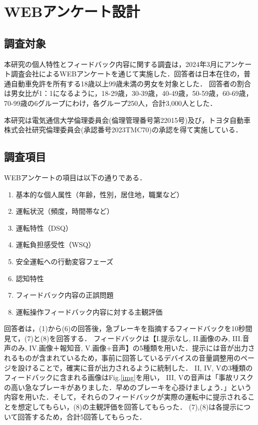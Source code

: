 \documentclass[twocolumn,a4j]{jarticle}
\begin{document}
\section{WEBアンケート設計}
\subsection{調査対象}
本研究の個人特性とフィードバック内容に関する調査は，2024年3月にアンケート調査会社によるWEBアンケートを通じて実施した．回答者は日本在住の，普通自動車免許を所有する18歳以上99歳未満の男女を対象とした．
回答者の割合は男女比が1：1になるように，18-29歳，30-39歳，40-49歳，50-59歳，60-69歳，70-99歳の6グループにわけ，各グループ250人，合計3,000人とした．

本研究は電気通信大学倫理委員会(倫理管理番号第22015号)及び，トヨタ自動車株式会社研究倫理委員会(承認番号2023TMC70)の承認を得て実施している．

\subsection{調査項目}
WEBアンケートの項目は以下の通りである．

\begin{enumerate}[label=(\arabic*), itemsep=0pt, parsep=0pt, leftmargin=*]
    \item 基本的な個人属性（年齢，性別，居住地，職業など）
    \item 運転状況（頻度，時間帯など）
    \item 運転特性（DSQ）\cite{check}
    \item 運転負担感受性（WSQ）\cite{check}
    \item 安全運転への行動変容フェーズ
    \item 認知特性\cite{cog}
    \item フィードバック内容の正誤問題
    \item 運転操作フィードバック内容に対する主観評価
\end{enumerate}

回答者は，(1)から(6)の回答後，急ブレーキを指摘するフィードバックを10秒間見て，(7)と(8)を回答する．
フィードバックは【I.提示なし, I\hspace{-1.2pt}I.画像のみ, I\hspace{-1.2pt}I\hspace{-1.2pt}I.音声のみ, I\hspace{-1.2pt}V.画像＋報知音, V.画像+音声】の5種類を用いた．提示には音が出力されるものが含まれているため，事前に回答しているデバイスの音量調整用のページを設けることで，確実に音が出力されるように統制した．
I\hspace{-1.2pt}I,  I\hspace{-1.2pt}V, Vの3種類のフィードバックに含まれる画像はFig.\ref{img}を用い， I\hspace{-1.2pt}I\hspace{-1.2pt}I, Vの音声は「事故リスクの高い急なブレーキがありました．早めのブレーキを心掛けましょう．」という内容を用いた．そして，それらのフィードバックが実際の運転中に提示されることを想定してもらい，(8)の主観評価を回答してもらった．
(7),(8)は各提示について回答するため，合計5回答してもらった．
\end{document}
